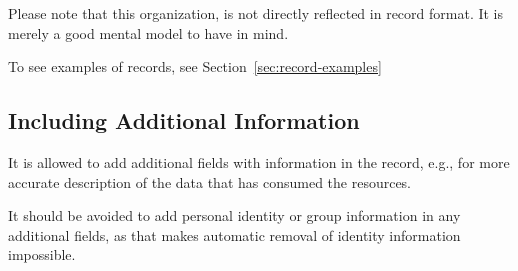 Please note that this organization, is not directly reflected in record format.
It is merely a good mental model to have in mind.

To see examples of records, see Section~\ref{sec:record-examples}


\subsection{Including Additional Information}

It is allowed to add additional fields with information in the record, e.g.,
for more accurate description of the data that has consumed the resources.

It should be avoided to add personal identity or group information in any
additional fields, as that makes automatic removal of identity information
impossible.

